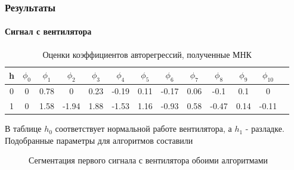 \documentclass[9pt]{beamer}
\begin{document}
\begin{frame}\frametitle{Результаты}
\framesubtitle{Сигнал с вентилятора}

\begin{table}[h]
\caption{Оценки коэффициентов авторегрессий, полученные МНК}
\begin{tabular}{|c|c|c|c|c|c|c|c|c|c|c|c|c|}
\hline
h & $\phi_0$ & $\phi_1$ & $\phi_2$ & $\phi_3$ & $\phi_4$ & $\phi_5$ & $\phi_6$ & $\phi_7$ & $\phi_8$ & $\phi_9$ & $\phi_{10}$\\
\hline
0 & 0 & 0.78 & 0 & 0.23 & -0.19 & 0.11 & -0.17 & 0.06 & -0.1 & 0.1 & 0\\
\hline
1 & 0 & 1.58 & -1.94 & 1.88 & -1.53 & 1.16 & -0.93 & 0.58 & -0.47 & 0.14 & -0.11\\
\hline
\end{tabular}
\end{table}

В таблице $h_0$ соответствует нормальной работе вентилятора, а $h_1$ - разладке. Подобранные параметры для алгоритмов составили 
\begin{figure}[h]
\begin{minipage}[h]{0.49\linewidth}
\end{minipage}
\begin{minipage}[h]{0.49\linewidth}
\end{minipage}
\caption{Сегментация первого сигнала с вентилятора обоими алгоритмами}
\end{figure}
\end{frame}
\end{document}
